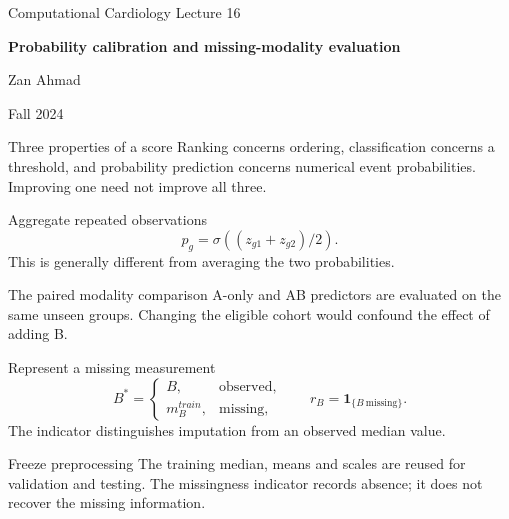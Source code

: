 \documentclass[aspectratio=169,11pt]{beamer}
\newcommand{\notestarget}{notes.pdf}\newcommand{\noteslabel}{Notes}
\begin{document}
\begin{frame}[plain]\vfill
{\small\color{accent} Computational Cardiology \quad Lecture 16}\par\medskip
{\raggedright{}\LARGE\bfseries\color{ink} Probability calibration and missing-modality evaluation}\par\bigskip
Zan Ahmad\par\smallskip
{\small Fall 2024}\par\vfill\end{frame}
\renewcommand{\notestarget}{notes.pdf\#note-group-level-scores-and-prediction-tasks}
\begin{frame}[t,fragile,label=slide-three-properties-of-a-score]{Three properties of a score}
Ranking concerns ordering, classification concerns a threshold, and probability prediction concerns numerical event probabilities.\pause{} Improving one need not improve all three.
\end{frame}
\renewcommand{\notestarget}{notes.pdf\#note-group-level-scores-and-prediction-tasks}
\begin{frame}[t,fragile,label=slide-aggregate-repeated-observations]{Aggregate repeated observations}
\[p_g=\sigma((z_{g1}+z_{g2})/2).\]\pause{} This is generally different from averaging the two probabilities.
\end{frame}
\renewcommand{\notestarget}{notes.pdf\#note-a-paired-missing-modality-intervention}
\begin{frame}[t,fragile,label=slide-the-paired-modality-comparison]{The paired modality comparison}
A-only and AB predictors are evaluated on the same unseen groups.\pause{} Changing the eligible cohort would confound the effect of adding B.
\end{frame}
\renewcommand{\notestarget}{notes.pdf\#note-imputation-missingness-indicators-and-a-fixed-cohort}
\begin{frame}[t,fragile,label=slide-represent-a-missing-measurement]{Represent a missing measurement}
\[B^*=\begin{cases}B,&\text{observed},\\m_B^{train},&\text{missing},\end{cases}\qquad r_B=\boldsymbol1_{\{B\ \text{missing}\}}.\]\pause{} The indicator distinguishes imputation from an observed median value.
\end{frame}
\renewcommand{\notestarget}{notes.pdf\#note-imputation-missingness-indicators-and-a-fixed-cohort}
\begin{frame}[t,fragile,label=slide-freeze-preprocessing]{Freeze preprocessing}
The training median, means and scales are reused for validation and testing.\pause{} The missingness indicator records absence; it does not recover the missing information.
\end{frame}
\end{document}
